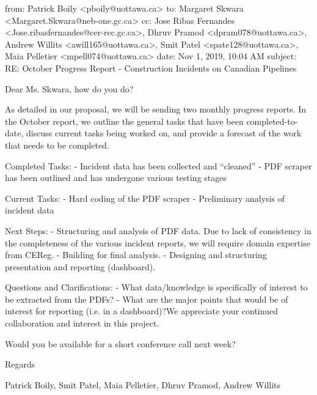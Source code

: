 from:	Patrick Boily <pboily@uottawa.ca>
to:	Margaret Skwara <Margaret.Skwara@neb-one.gc.ca>
cc:	Jose Ribas Fernandes <Jose.ribasfernandes@cer-rec.gc.ca>,
Dhruv Pramod <dpram078@uottawa.ca>,
Andrew Willits <awill165@uottawa.ca>,
Smit Patel <spate128@uottawa.ca>,
Maia Pelletier <mpell074@uottawa.ca>
date:	Nov 1, 2019, 10:04 AM
subject:	RE: October Progress Report - Construction Incidents on Canadian Pipelines


Dear Ms. Skwara, how do you do?

 

As detailed in our proposal, we will be sending two monthly progress reports. In the October report, we outline the general tasks that have been completed-to-date, discuss current tasks being worked on, and provide a forecast of the work that needs to be completed.

 

Completed Tasks:
- Incident data has been collected and “cleaned”
- PDF scraper has been outlined and has undergone various testing stages

 

Current Tasks:
- Hard coding of the PDF scraper
- Preliminary analysis of incident data

 

Next Steps:
- Structuring and analysis of PDF data. Due to lack of consistency in the completeness of the various incident reports, we will require domain expertise from CEReg.  
- Building for final analysis.
- Designing and structuring presentation and reporting (dashboard).

 

Questions and Clarifications:
- What data/knowledge is specifically of interest to be extracted from the PDFs?
- What are the major points that would be of interest for reporting (i.e. in a dashboard)?We appreciate your continued collaboration and interest in this project.

 

Would you be available for a short conference call next week?

 

Regards

 

Patrick Boily, Smit Patel, Maia Pelletier, Dhruv Pramod, Andrew Willits  